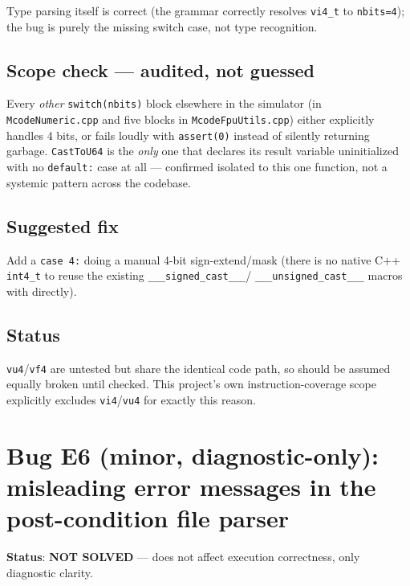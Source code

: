 \documentclass[11pt,a4paper]{report}
\begin{document}
Type parsing itself is correct (the grammar correctly resolves \texttt{vi4\_t} to
\texttt{nbits=4}); the bug is purely the missing switch case, not type recognition.

\subsection*{Scope check --- audited, not guessed}
Every \emph{other} \texttt{switch(nbits)} block elsewhere in the simulator (in
\texttt{McodeNumeric.cpp} and five blocks in \texttt{McodeFpuUtils.cpp}) either explicitly
handles 4 bits, or fails loudly with \texttt{assert(0)} instead of silently returning
garbage. \texttt{CastToU64} is the \emph{only} one that declares its result variable
uninitialized with no \texttt{default:} case at all --- confirmed isolated to this one
function, not a systemic pattern across the codebase.

\subsection*{Suggested fix}
Add a \texttt{case 4:} doing a manual 4-bit sign-extend/mask (there is no native C++
\texttt{int4\_t} to reuse the existing \texttt{\_\_\_signed\_cast\_\_\_}/
\texttt{\_\_\_unsigned\_cast\_\_\_} macros with directly).

\subsection*{Status}
\texttt{vu4}/\texttt{vf4} are untested but share the identical code path, so should be
assumed equally broken until checked. This project's own instruction-coverage scope
explicitly excludes \texttt{vi4}/\texttt{vu4} for exactly this reason.

\section{Bug E6 (minor, diagnostic-only): misleading error messages in the post-condition file parser}

\textbf{Status}: \textbf{NOT SOLVED} --- does not affect execution correctness, only
diagnostic clarity.
\end{document}
